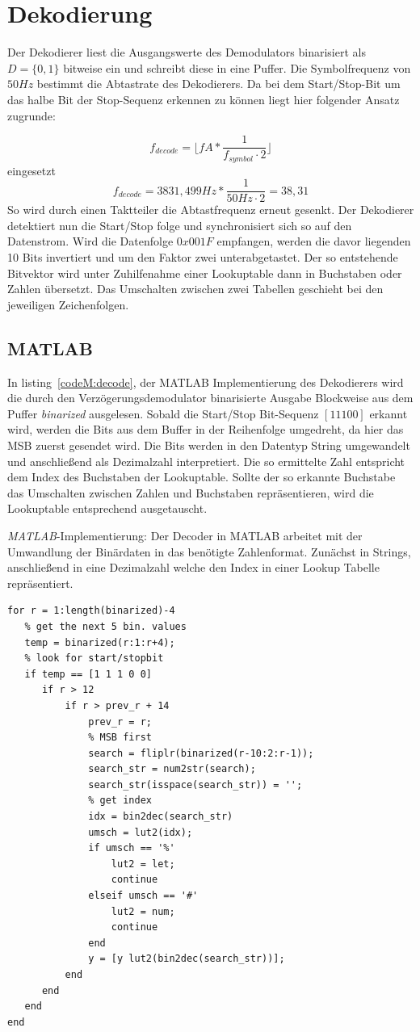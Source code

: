 \documentclass{article}
\begin{document}
\section{Dekodierung}

Der Dekodierer liest die Ausgangswerte des Demodulators binarisiert als $D = \{0,1\}$ bitweise ein und schreibt diese in eine Puffer. 
Die Symbolfrequenz von $50Hz$ bestimmt die Abtastrate des Dekodierers. Da bei dem Start/Stop-Bit um das
halbe Bit der Stop-Sequenz erkennen zu können liegt hier folgender Ansatz zugrunde:

$$
f_{decode} = \lfloor fA * \frac{1}{f_{symbol} \cdot 2}\rfloor 
$$
eingesetzt
$$
f_{decode} = 3831,499Hz * \frac{1}{50Hz\cdot 2} = 38,31
$$
So wird durch einen Taktteiler die Abtastfrequenz erneut gesenkt. Der Dekodierer detektiert nun die Start/Stop folge und synchronisiert sich so auf den Datenstrom. Wird die Datenfolge $0x001F$ empfangen, werden die davor liegenden 10 Bits invertiert und um den Faktor zwei unterabgetastet. Der so entstehende Bitvektor wird unter Zuhilfenahme einer Lookuptable dann in Buchstaben oder Zahlen übersetzt. Das Umschalten zwischen zwei Tabellen geschieht bei den jeweiligen Zeichenfolgen.
\subsection{MATLAB}
In listing~\ref{codeM:decode}, der MATLAB Implementierung des Dekodierers wird die durch den Verzögerungsdemodulator binarisierte Ausgabe
Blockweise aus dem Puffer \textit{binarized} ausgelesen. Sobald die Start/Stop Bit-Sequenz $[1 1 1 0 0]$ erkannt wird, werden die Bits aus dem Buffer
in der Reihenfolge umgedreht, da hier das MSB zuerst gesendet wird. Die Bits werden in den Datentyp String umgewandelt und anschließend
als Dezimalzahl interpretiert. Die so ermittelte Zahl entspricht dem Index des Buchstaben der Lookuptable. 
Sollte der so erkannte Buchstabe das Umschalten zwischen Zahlen und Buchstaben repräsentieren, wird die Lookuptable
entsprechend ausgetauscht. 
\begin{listing}\label{codeM:decode}
    \caption{\textit{MATLAB}-Implementierung: Der Decoder in MATLAB arbeitet mit der Umwandlung der Binärdaten in das benötigte Zahlenformat. Zunächst in Strings, 
    anschließend in eine Dezimalzahl welche den Index in einer Lookup Tabelle repräsentiert.}
    \begin{verbatim}
for r = 1:length(binarized)-4
   % get the next 5 bin. values
   temp = binarized(r:1:r+4);
   % look for start/stopbit
   if temp == [1 1 1 0 0]
      if r > 12
          if r > prev_r + 14 
              prev_r = r;
              % MSB first
              search = fliplr(binarized(r-10:2:r-1));
              search_str = num2str(search);
              search_str(isspace(search_str)) = '';
              % get index
              idx = bin2dec(search_str)
              umsch = lut2(idx);
              if umsch == '%'
                  lut2 = let;
                  continue
              elseif umsch == '#'
                  lut2 = num;
                  continue
              end
              y = [y lut2(bin2dec(search_str))];
          end
      end
   end
end
\end{verbatim}
\end{listing}
\end{document}
